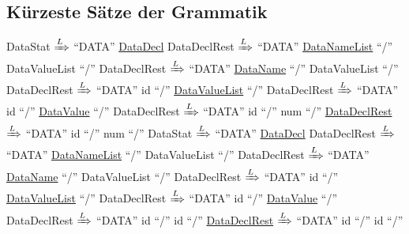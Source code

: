 \documentclass[11pt, a4paper, twoside]{article}   	%
\begin{document}
\subsection{Kürzeste Sätze der Grammatik}
DataStat $\xRightarrow{L}$ \enquote{DATA} \underline{DataDecl} DataDeclRest
\newline
\null\hspace{1.55cm} $\xRightarrow{L}$ \enquote{DATA} \underline{DataNameList} \enquote{/} DataValueList \enquote{/} DataDeclRest
\newline
\null\hspace{1.55cm} $\xRightarrow{L}$ \enquote{DATA} \underline{DataName} \enquote{/} DataValueList \enquote{/} DataDeclRest
\newline
\null\hspace{1.55cm} $\xRightarrow{L}$ \enquote{DATA} id \enquote{/} \underline{DataValueList} \enquote{/} DataDeclRest
\newline
\null\hspace{1.55cm} $\xRightarrow{L}$ \enquote{DATA} id \enquote{/} \underline{DataValue} \enquote{/} DataDeclRest
\newline
\null\hspace{1.55cm} $\xRightarrow{L}$ \enquote{DATA} id \enquote{/} num  \enquote{/} \underline{DataDeclRest}
\newline
\null\hspace{1.55cm} $\xRightarrow{L}$ \enquote{DATA} id \enquote{/} num  \enquote{/}
\newline
\newline
\newline
%
DataStat $\xRightarrow{L}$ \enquote{DATA} \underline{DataDecl} DataDeclRest
\newline
\null\hspace{1.55cm} $\xRightarrow{L}$ \enquote{DATA} \underline{DataNameList} \enquote{/} DataValueList \enquote{/} DataDeclRest
\newline
\null\hspace{1.55cm} $\xRightarrow{L}$ \enquote{DATA} \underline{DataName} \enquote{/} DataValueList \enquote{/} DataDeclRest
\newline
\null\hspace{1.55cm} $\xRightarrow{L}$ \enquote{DATA} id \enquote{/} \underline{DataValueList} \enquote{/} DataDeclRest
\newline
\null\hspace{1.55cm} $\xRightarrow{L}$ \enquote{DATA} id \enquote{/} \underline{DataValue} \enquote{/} DataDeclRest
\newline
\null\hspace{1.55cm} $\xRightarrow{L}$ \enquote{DATA} id \enquote{/} id  \enquote{/} \underline{DataDeclRest}
\newline
\null\hspace{1.55cm} $\xRightarrow{L}$ \enquote{DATA} id \enquote{/} id  \enquote{/}
\newpage
\end{document}

